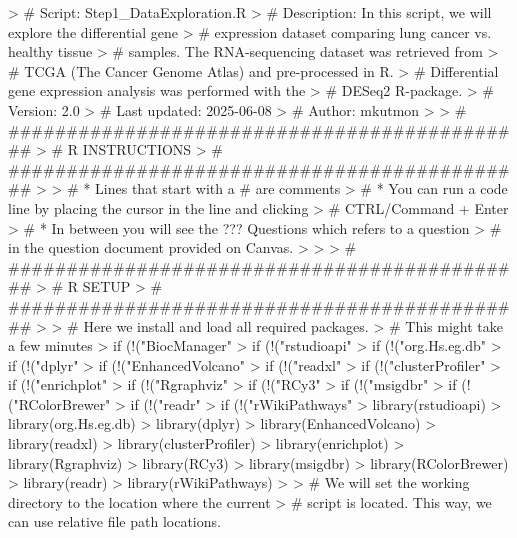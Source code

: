 \documentclass{article}
\begin{document}


\begin{Schunk}
\begin{Sinput}
> # Script:       Step1_DataExploration.R
> # Description:  In this script, we will explore the differential gene 
> #               expression dataset comparing lung cancer vs. healthy tissue
> #               samples. The RNA-sequencing dataset was retrieved from 
> #               TCGA (The Cancer Genome Atlas) and pre-processed in R. 
> #               Differential gene expression analysis was performed with the 
> #               DESeq2 R-package. 
> # Version: 2.0
> # Last updated: 2025-06-08
> # Author: mkutmon
> 
> # #############################################
> # R INSTRUCTIONS
> # #############################################
> 
> # * Lines that start with a # are comments
> # * You can run a code line by placing the cursor in the line and clicking 
> #   CTRL/Command + Enter
> # * In between you will see the ??? Questions which refers to a question 
> #   in the question document provided on Canvas.
> 
> 
> # #############################################
> # R SETUP
> # #############################################
> 
> # Here we install and load all required packages. 
> # This might take a few minutes
> if (!("BiocManager" %in% installed.packages())) { install.packages("BiocManager", update=FALSE) }
> if (!("rstudioapi" %in% installed.packages())) { BiocManager::install("rstudioapi", update=FALSE) }
> if (!("org.Hs.eg.db" %in% installed.packages())) { BiocManager::install("org.Hs.eg.db", update=FALSE) }
> if (!("dplyr" %in% installed.packages())) { BiocManager::install("dplyr", update=FALSE) }
> if (!("EnhancedVolcano" %in% installed.packages())) { BiocManager::install("EnhancedVolcano", update=FALSE) }
> if (!("readxl" %in% installed.packages())) { BiocManager::install("readxl", update=FALSE) }
> if (!("clusterProfiler" %in% installed.packages())) { BiocManager::install("clusterProfiler", update=FALSE) }
> if (!("enrichplot" %in% installed.packages())) { BiocManager::install("enrichplot", update=FALSE) }
> if (!("Rgraphviz" %in% installed.packages())) { BiocManager::install("Rgraphviz", update=FALSE) }
> if (!("RCy3" %in% installed.packages())) { BiocManager::install("RCy3", update=FALSE) }
> if (!("msigdbr" %in% installed.packages())) { BiocManager::install("msigdbr",update=FALSE) }
> if (!("RColorBrewer" %in% installed.packages())) { BiocManager::install("RColorBrewer",update=FALSE) }
> if (!("readr" %in% installed.packages())) { BiocManager::install("readr",update=FALSE) }
> if (!("rWikiPathways" %in% installed.packages())) { BiocManager::install("rWikiPathways",update=FALSE) }
> library(rstudioapi)
> library(org.Hs.eg.db)
> library(dplyr)
> library(EnhancedVolcano)
> library(readxl)
> library(clusterProfiler)
> library(enrichplot)
> library(Rgraphviz)
> library(RCy3)
> library(msigdbr)
> library(RColorBrewer)
> library(readr)
> library(rWikiPathways)
> 
> # We will set the working directory to the location where the current 
> # script is located. This way, we can use relative file path locations. 
\end{Sinput}
\end{Schunk}
\end{document}
